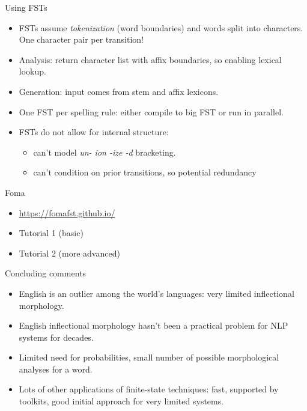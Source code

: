 \documentclass{beamer}
\begin{document}
\begin{frame}{Using FSTs}
  \begin{itemize}
  \item FSTs assume \emph{tokenization} (word boundaries) and words
    split into characters.  One character pair per transition!
  \item Analysis: return character list with affix boundaries, so
    enabling lexical lookup.
  \item Generation: input comes from stem and affix lexicons.
  \item One FST per spelling rule: either compile to big FST or run in
    parallel.
  \item FSTs do not allow for internal structure:
    \begin{itemize}
    \item can't model {\it un- ion -ize -d} bracketing.
    \item can't condition on prior transitions, so potential
      redundancy
    \end{itemize}
  \end{itemize}
\end{frame}

\begin{frame}{Foma}
  \begin{itemize}
  \item \url{https://fomafst.github.io/}
  \item Tutorial 1 (basic)
  \item Tutorial 2 (more advanced)
  \end{itemize}
\end{frame}

\begin{frame}{Concluding comments}
  \begin{itemize}
  \item English is an outlier among the world's languages: very
    limited inflectional morphology.
  \item English inflectional morphology hasn't been a practical
    problem for NLP systems for decades.
  \item Limited need for probabilities, small number of possible morphological analyses for a word.
  \item Lots of other applications of finite-state techniques: fast,
    supported by toolkits, good initial approach for very limited
    systems.
  \end{itemize}
\end{frame}
\end{document}
